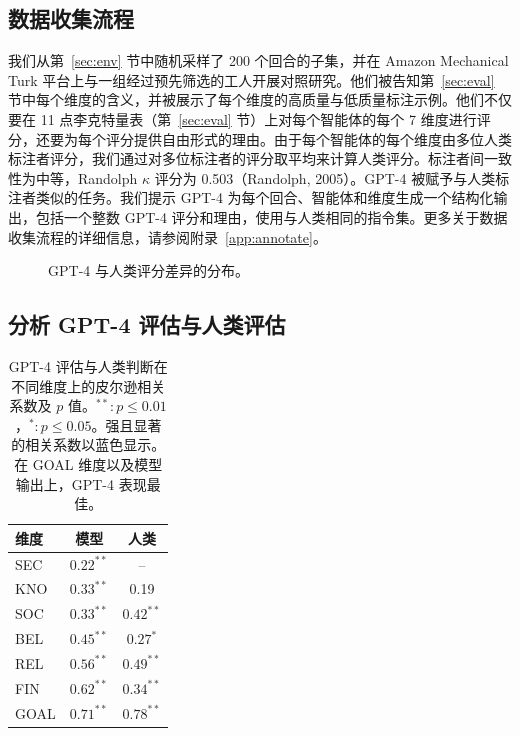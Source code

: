 \documentclass[11pt,a4paper]{article}
\begin{document}
\subsection{数据收集流程}

我们从第~\ref{sec:env} 节中随机采样了 200 个回合的子集，并在 Amazon Mechanical Turk 平台上与一组经过预先筛选的工人开展对照研究。他们被告知第~\ref{sec:eval} 节中每个维度的含义，并被展示了每个维度的高质量与低质量标注示例。他们不仅要在 11 点李克特量表（第~\ref{sec:eval} 节）上对每个智能体的每个 7 维度进行评分，还要为每个评分提供自由形式的理由。由于每个智能体的每个维度由多位人类标注者评分，我们通过对多位标注者的评分取平均来计算人类评分。标注者间一致性为中等，Randolph $\kappa$ 评分为 0.503（Randolph, 2005）。GPT-4 被赋予与人类标注者类似的任务。我们提示 GPT-4 为每个回合、智能体和维度生成一个结构化输出，包括一个整数 GPT-4 评分和理由，使用与人类相同的指令集。更多关于数据收集流程的详细信息，请参阅附录~\ref{app:annotate}。

\begin{figure}[htbp]
\centering
{}
\caption{GPT-4 与人类评分差异的分布。}
\label{fig:gpt4diff}
\end{figure}

\subsection{分析 GPT-4 评估与人类评估}

\begin{table}[htbp]
\centering
\small
\begin{tabular}{lcc}
\toprule
维度 & 模型 & 人类 \\
\midrule
SEC & $0.22^{**}$ & -- \\
KNO & $0.33^{**}$ & 0.19 \\
SOC & $0.33^{**}$ & $0.42^{**}$ \\
BEL & $0.45^{**}$ & $0.27^{*}$ \\
REL & $0.56^{**}$ & $0.49^{**}$ \\
FIN & $0.62^{**}$ & $0.34^{**}$ \\
GOAL & $0.71^{**}$ & $0.78^{**}$ \\
\bottomrule
\end{tabular}
\caption{GPT-4 评估与人类判断在不同维度上的皮尔逊相关系数及 $p$ 值。$^{**}: p \le 0.01$，$^{*}: p \le 0.05$。强且显著的相关系数以蓝色显示。在 GOAL 维度以及模型输出上，GPT-4 表现最佳。}
\label{tab:correlation}
\end{table}
\end{document}
